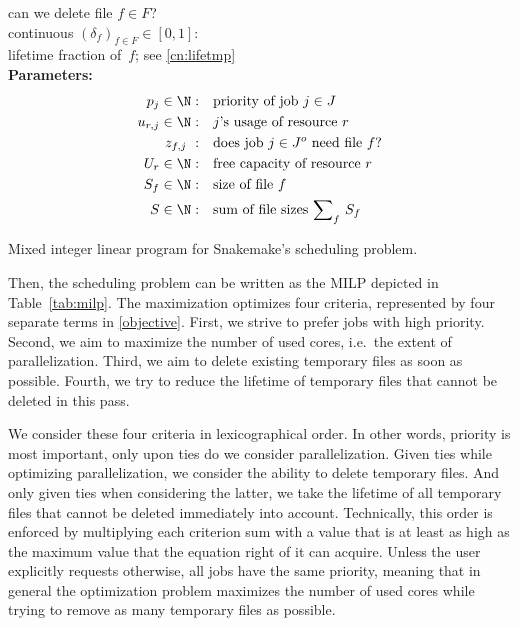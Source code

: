 \documentclass[parskip=half, DIV=18]{scrartcl}
\begin{document}
\begin{table}
\begin{minipage}[t]{0.44\textwidth}
can we delete file $f\in F$? \\[1ex]
continuous $(\delta_f)_{f\in F} \in [0,1]$: \\
lifetime fraction of~$f$; see \eqref{cn:lifetmp} \\[2ex]
\textbf{Parameters:}
\begin{align*}
p_j\in\N     :& \quad \text{priority of job $j\in J$} \\
u_{r,j}\in\N :& \quad \text{$j$'s usage of resource~$r$} \\
z_{f,j}\     :& \quad \text{does job~$j\in J^o$ need file~$f$?} \\
U_r\in\N     :& \quad \text{free capacity of resource~$r$}\\
S_f\in\N     :& \quad \text{size of file~$f$} \\
S\in\N       :& \quad \text{sum of file sizes $\sum\nolimits_f\, S_f$} \\
\end{align*}
\end{minipage}
\caption{Mixed integer linear program for Snakemake's scheduling problem.}
\label{tab:milp}
\end{table}

Then, the scheduling problem can be written as the MILP depicted in Table~\ref{tab:milp}.
The maximization optimizes four criteria, represented by four separate terms in \eqref{objective}.
First, we strive to prefer jobs with high priority.
Second, we aim to maximize the number of used cores, i.e.\ the extent of parallelization.
Third, we aim to delete existing temporary files as soon as possible.
Fourth, we try to reduce the lifetime of temporary files that cannot be deleted in this pass.

We consider these four criteria in lexicographical order.
In other words, priority is most important, only upon ties do we consider parallelization.
Given ties while optimizing parallelization, we consider the ability to delete temporary files.
And only given ties when considering the latter, we take the lifetime of all temporary files that cannot be deleted immediately into account.
Technically, this order is enforced by multiplying each criterion sum with a value that is at least as high as the maximum value that the equation right of it can acquire.
Unless the user explicitly requests otherwise, all jobs have the same priority, meaning that in general the optimization problem maximizes the number of used cores while trying to remove as many temporary files as possible.
\end{document}

